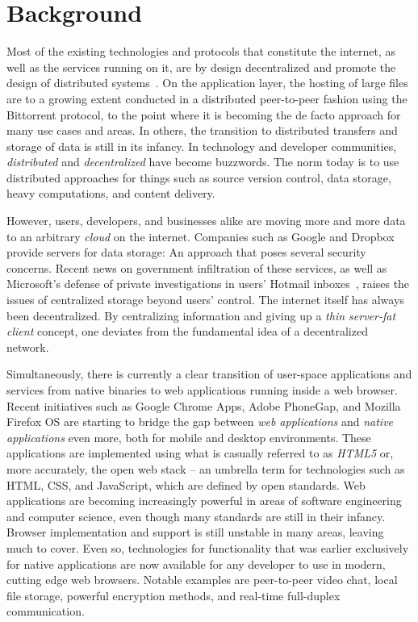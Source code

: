 \section{Background}

Most of the existing technologies and protocols that constitute the internet, as well as the services running on it, are by design decentralized and promote the design of distributed systems~\cite{InternetDecenterlized:Online}. On the application layer, the hosting of large files are to a growing extent conducted in a distributed peer-to-peer fashion using the Bittorrent protocol, to the point where it is becoming the de facto approach for many use cases and areas. In others, the transition to distributed transfers and storage of data is still in its infancy. In technology and developer communities, \emph{distributed} and \emph{decentralized} have become buzzwords. The norm today is to use distributed approaches for things such as source version control, data storage, heavy computations, and content delivery.

However, users, developers, and businesses alike are moving more and more data to an arbitrary \emph{cloud} on the internet. Companies such as Google and Dropbox provide servers for data storage: An approach that poses several security concerns. Recent news on government infiltration of these services, as well as Microsoft's defense of private investigations in users' Hotmail inboxes~\cite{Frank:2014}, raises the issues of centralized storage beyond users' control. The internet itself has always been decentralized. By centralizing information and giving up a \emph{thin server-fat client} concept, one deviates from the fundamental idea of a decentralized network.

Simultaneously, there is currently a clear transition of user-space applications and services from native binaries to web applications running inside a web browser. Recent initiatives such as Google Chrome Apps, Adobe PhoneGap, and Mozilla Firefox OS are starting to bridge the gap between \emph{web applications} and \emph{native applications} even more, both for mobile and desktop environments. These applications are implemented using what is casually referred to as \emph{HTML5} or, more accurately, the open web stack – an umbrella term for technologies such as HTML, CSS, and JavaScript, which are defined by open standards. Web applications are becoming increasingly powerful in areas of software engineering and computer science, even though many standards are still in their infancy. Browser implementation and support is still unstable in many areas, leaving much to cover. Even so, technologies for functionality that was earlier exclusively for native applications are now available for any developer to use in modern, cutting edge web browsers. Notable examples are peer-to-peer video chat, local file storage, powerful encryption methods, and real-time full-duplex communication.

